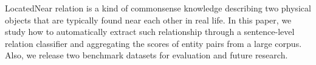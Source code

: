 LocatedNear relation is a kind of commonsense knowledge describing two physical objects that are typically found near each other in real life. In this paper, we study how to automatically extract such relationship through a sentence-level relation classifier and aggregating the scores of entity pairs from a large corpus. Also, we release two benchmark datasets for evaluation and future research.
